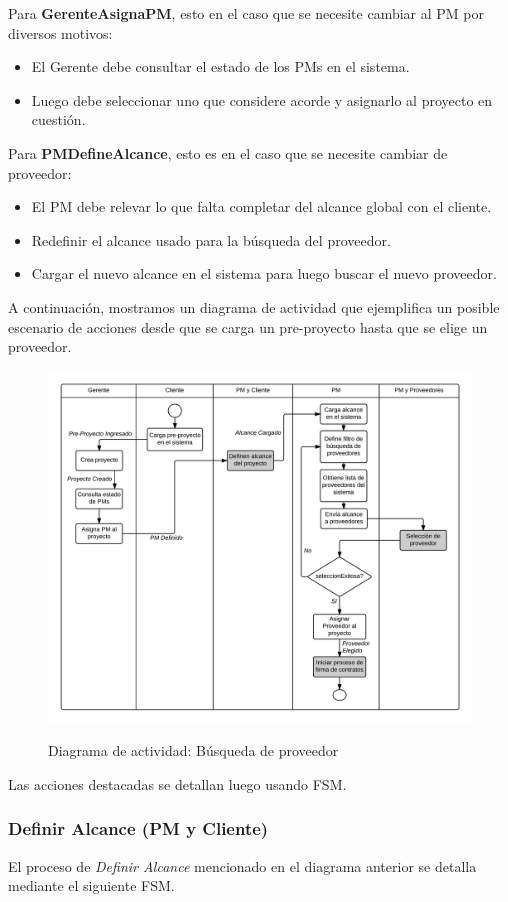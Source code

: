 Para \textbf{GerenteAsignaPM}, esto en el caso que se necesite cambiar al PM 
por diversos motivos:
\begin{itemize}
	\item El Gerente debe consultar el estado de los PMs en el sistema. 
	\item Luego debe seleccionar uno que considere acorde y asignarlo al proyecto 
	en cuestión. 
\end{itemize}

Para \textbf{PMDefineAlcance}, esto es en el caso que se necesite cambiar de proveedor:
\begin{itemize}
	\item El PM debe relevar lo que falta completar del alcance global 
	con el cliente. 
	\item Redefinir el alcance usado para la búsqueda del proveedor. 
	\item Cargar el nuevo alcance en el sistema para luego buscar el nuevo proveedor. 
\end{itemize}

A continuación, mostramos un diagrama de actividad que ejemplifica un posible 
escenario de acciones desde que se carga un pre-proyecto hasta que se elige un 
proveedor. 

\begin{figure}[H]
\centering
\includegraphics[width=0.8\linewidth]{diag/nuevos/act-busqprov.png}
\label{fig:busqprov}
\caption{Diagrama de actividad: Búsqueda de proveedor}
\end{figure}

Las acciones destacadas se detallan luego usando FSM. 


	\subsubsection{Definir Alcance (PM y Cliente)}
El proceso de \textit{Definir Alcance} mencionado en el diagrama anterior 
se detalla mediante el siguiente FSM. 

